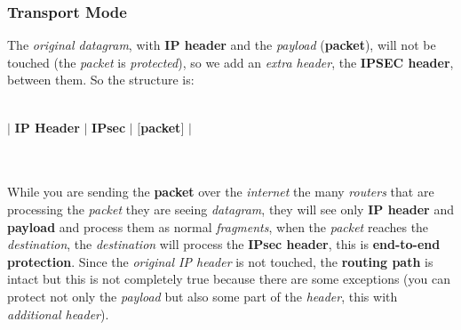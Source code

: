 \documentclass{article}
\begin{document}
\subsubsection{Transport Mode}
The \emph{original datagram}, with \textbf{IP header} and the \emph{payload} (\textbf{packet}), will not be touched (the \emph{packet} is \emph{protected}), so we add an \emph{extra header}, the \textbf{IPSEC header}, between them. So the structure is: \\\\
\centerline{$|$ \textbf{IP Header} $|$ \textbf{IPsec} $|$ $[$\textbf{packet}$]$ $|$}\\\\
While you are sending the \textbf{packet} over the \emph{internet} the many \emph{routers} that are processing the \emph{packet} they are seeing \emph{datagram}, they will see only \textbf{IP header} and \textbf{payload} and process them as normal \emph{fragments}, when the \emph{packet} reaches the \emph{destination}, the \emph{destination} will process the \textbf{IPsec header}, this is \textbf{end-to-end protection}. Since the \emph{original IP header} is not touched, the \textbf{routing path} is intact but this is not completely true because there are some exceptions (you can protect not only the \emph{payload} but also some part of the \emph{header}, this with \emph{additional header}). 
\end{document}
